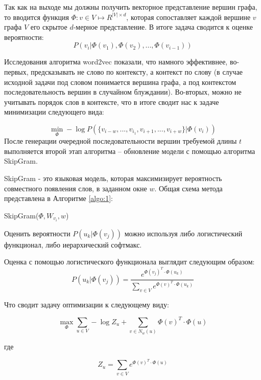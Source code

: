 Так как на выходе мы должны получить векторное представление вершин графа, то вводится функция $\Phi: v \in V \mapsto R^{|V| \times d} $, которая сопоставляет каждой вершине $v$ графа $V$ его скрытое $d$-мерное представление. В итоге задача сводится к оценке вероятности:
$$P(v_i|\Phi(v_1), \Phi(v_2), ..., \Phi(v_{i-1}))$$



Исследования алгоритма word2vec показали, что намного эффективнее, во-первых, предсказывать не слово по контексту, а контекст по слову (в случае исходной задачи под словом понимается вершина графа, а под контекстом последовательность вершин в случайном блуждании).  Во-вторых, можно не учитывать порядок слов в контексте, что в итоге сводит нас к задаче минимизации следующего вида:

$$\min_{\Phi} -\log P(\{v_{i-w}, ..., v_{i_1}, v_{i+1}, ..., v_{i+w}\} | \Phi (v_i))$$
После генерации очередной последовательности вершин требуемой длины $t$ выполняется второй этап алгоритма -- обновление модели с помощью алгоритма SkipGram.

SkipGram - это языковая модель, которая максимизирует вероятность совместного появления слов, в заданном  окне $w$. Общая схема метода представлена в Алгоритме \ref{algo:1}:

\begin{algorithm}[H]

    \caption{SkipGram($\Phi, W_{v_i}, w$)}
    \label{algo:1}
\end{algorithm}

Оценить вероятности $P(u_k | \Phi(v_j))$  можно используя либо логистический функционал, либо иерархический софтмакс. 

Оценка с помощью логистического функционала выглядит следующим образом:
$$P(u_k | \Phi(v_j)) = \frac{e^{\Phi(v_j)^T \cdot \Phi(u_k)}}{\sum_{v \in V} e^{\Phi(v)^T \cdot \Phi(u_k)}}$$

Что сводит задачу оптимизации к следующему виду:

$$
\max_{\Phi} \sum_{u \in V} -\log Z_u + \sum_{v \in N_w(u)} \Phi(v)^T \cdot \Phi(u)
$$

где 

\begin{equation} \label{Z_u}
Z_u = \sum_{v \in V} e^{ \Phi(v)^T \cdot \Phi(u)}
\end{equation}


